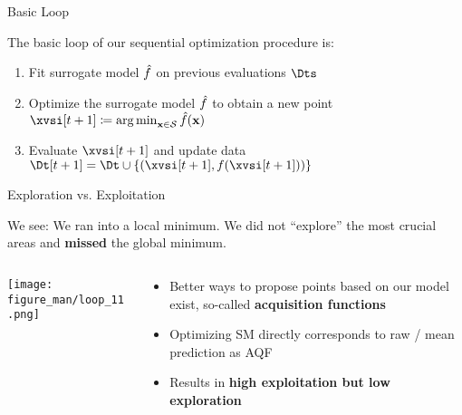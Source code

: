 \documentclass[11pt,compress,t,notes=noshow, xcolor=table]{beamer}
\begin{document}
\begin{vbframe}{Basic Loop}

The basic loop of our sequential optimization procedure is:
  \begin{enumerate}
    \item Fit surrogate model $\hat{f}$ on previous evaluations $\Dts$
    \item Optimize the surrogate model $\hat{f}$ to obtain a new point $\xvsi[t+1] \coloneqq \argmin_{\xv \in \mathcal{S}} \fh(\xv)$
    \item Evaluate $\xvsi[t+1]$ and update data $\Dt[t+1] = \Dt \cup \{(\xvsi[t+1], f(\xvsi[t+1]))\}$
  \end{enumerate}

\end{vbframe}

\begin{vbframe}{Exploration vs. Exploitation}

We see: We ran into a local minimum. We did not \enquote{explore} the most crucial areas and \textbf{missed} the global minimum.

\vspace*{0.5cm} 

\begin{columns}[T]
\begin{column}{0.5\textwidth}
  \texttt{[image: figure\_man/loop\_11.png]}\end{column}
\begin{column}{0.5\textwidth}
\begin{itemize}
\item Better ways to propose points based on our model exist, so-called \textbf{acquisition functions}
  \item Optimizing SM directly corresponds to raw / mean prediction as AQF
  \item Results in \textbf{high exploitation but low exploration}
\end{itemize}
\end{column}

\end{columns}





\end{vbframe} 

\endlecture
\end{document}
